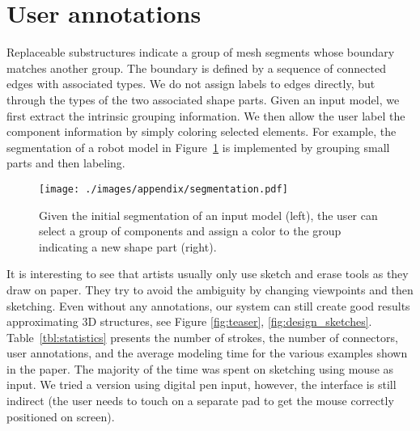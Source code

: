 

%
\chapter*{\thechapter \quad User annotations}
\label{appendixA}

Replaceable substructures indicate a group of mesh segments whose boundary matches another group. The boundary is defined by a sequence of connected edges with associated types. We do not assign labels to edges directly, but through the types of the two associated shape parts. Given an input model, we first extract the intrinsic grouping information. We then allow the user label the component information by simply coloring selected elements. For example, the segmentation of a robot model in Figure~\ref{fig:segmentation} is implemented by grouping small parts and then labeling.

\begin{figure}[b!]
  \vnudge
  \texttt{[image: ./images/appendix/segmentation.pdf]}
  \caption{Given the initial segmentation of an input model (left), the user can select a group of components and assign a color to the group indicating a new shape part (right).}
  \label{fig:segmentation}
\end{figure}

 It is interesting to see that artists usually only use sketch and erase tools as they draw on paper. They try to avoid the ambiguity by changing viewpoints and then sketching. Even without any annotations, our system can still create good results approximating 3D structures, see Figure \ref{fig:teaser}, \ref{fig:design_sketches}. Table~\ref{tbl:statistics} presents the number of strokes, the number of connectors, user annotations, and the average modeling time for the various examples shown in the paper. The majority of the time was spent on sketching using mouse as input. We tried a version using digital pen input, however, the interface is still indirect (the user needs to touch on a separate pad to get the mouse correctly positioned on screen).



